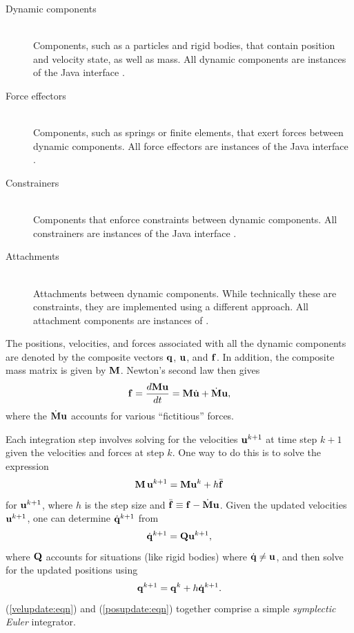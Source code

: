 \begin{description}
	
\item[Dynamic components] \mbox{}\hfill\\ Components, such as a
particles and rigid bodies, that contain position and velocity state,
as well as mass. All dynamic components are instances of
the Java interface
.

\item[Force effectors] \mbox{}\hfill\\
Components, such as springs or finite elements,
that exert forces between dynamic components.
All force effectors are instances of the Java interface
.

\item[Constrainers] \mbox{}\hfill\\
Components that enforce constraints between dynamic components. 
All constrainers are instances of the Java interface
.

\item[Attachments] \mbox{}\hfill\\
Attachments between dynamic components. While technically these
are constraints, they are implemented using a different approach.
All attachment components are instances of
.

\end{description}

The positions, velocities, and forces associated with all the
dynamic components are denoted by the composite vectors 
${\bf q}$, ${\bf u}$, and ${\bf f}$. 
In addition, the composite mass matrix is given by
${\bf M}$. 
Newton's second law then gives
\begin{equation}
{\bf f} = \frac{d {\bf M} {\bf u}}{d t} = {\bf M} \dot{{\bf u}} + \dot{{\bf M}} {\bf u},
\label{newton:eqn}
\end{equation}
%
where the $\dot{{\bf M}} {\bf u}$ accounts for various ``fictitious'' forces.

Each integration step involves solving for
the velocities ${\bf u}^{k+1}$ at time step $k+1$ given the velocities and forces
at step $k$. One way to do this is to solve the expression
%
\begin{equation}
{\bf M} \, {\bf u}^{k+1} = {\bf M} {\bf u}^k + h \bar{{\bf f}}
\label{velupdate:eqn}
\end{equation}
%
for ${\bf u}^{k+1}$, where $h$ is the step size and 
$\bar{{\bf f}} \equiv {\bf f} - \dot{{\bf M}} {\bf u}$. Given the updated velocities ${\bf u}^{k+1}$, one can
determine $\dot{{\bf q}}^{k+1}$ from
%
\begin{equation}
\dot{{\bf q}}^{k+1} = {\bf Q} {\bf u}^{k+1},
\end{equation}
%
where ${\bf Q}$ accounts for situations (like rigid bodies) where $\dot{{\bf q}} \ne
{\bf u}$, and then solve for the updated positions using 
%
\begin{equation}
{\bf q}^{k+1} = {\bf q}^k + h \dot {{\bf q}}^{k+1}.
\label{posupdate:eqn}
\end{equation}
%
(\ref{velupdate:eqn}) and (\ref{posupdate:eqn}) together comprise a
simple {\it symplectic Euler} integrator.

